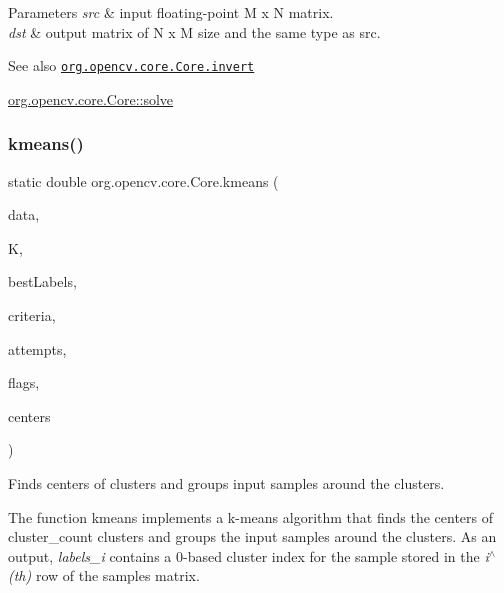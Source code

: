 \begin{DoxyParams}{Parameters}
{\em src} & input floating-\/point {\ttfamily M x N} matrix. \\
\hline
{\em dst} & output matrix of {\ttfamily N x M} size and the same type as {\ttfamily src}.\\
\hline
\end{DoxyParams}
\begin{DoxySeeAlso}{See also}
\href{http://docs.opencv.org/modules/core/doc/operations_on_arrays.html#invert}{\tt org.\+opencv.\+core.\+Core.\+invert} 

\mbox{\hyperlink{classorg_1_1opencv_1_1core_1_1_core_af6e1ab8eaa1618c30a16e38da739bbeb}{org.\+opencv.\+core.\+Core\+::solve}} 
\end{DoxySeeAlso}
\mbox{\label{classorg_1_1opencv_1_1core_1_1_core_a9870d70cc55618004735e38a0931ab3a}} 
\subsubsection{\texorpdfstring{kmeans()}{kmeans()}\hspace{0.1cm}{\footnotesize\ttfamily [1/2]}}
{\footnotesize\ttfamily static double org.\+opencv.\+core.\+Core.\+kmeans (\begin{DoxyParamCaption}\item[{\mbox{\hyperlink{classorg_1_1opencv_1_1core_1_1_mat}{Mat}}}]{data,  }\item[{int}]{K,  }\item[{\mbox{\hyperlink{classorg_1_1opencv_1_1core_1_1_mat}{Mat}}}]{best\+Labels,  }\item[{\mbox{\hyperlink{classorg_1_1opencv_1_1core_1_1_term_criteria}{Term\+Criteria}}}]{criteria,  }\item[{int}]{attempts,  }\item[{int}]{flags,  }\item[{\mbox{\hyperlink{classorg_1_1opencv_1_1core_1_1_mat}{Mat}}}]{centers }\end{DoxyParamCaption})\hspace{0.3cm}{\ttfamily [static]}}

Finds centers of clusters and groups input samples around the clusters.

The function {\ttfamily kmeans} implements a k-\/means algorithm that finds the centers of {\ttfamily cluster\+\_\+count} clusters and groups the input samples around the clusters. As an output, {\itshape labels\+\_\+i} contains a 0-\/based cluster index for the sample stored in the {\itshape i$^\wedge$(th)} row of the {\ttfamily samples} matrix.

